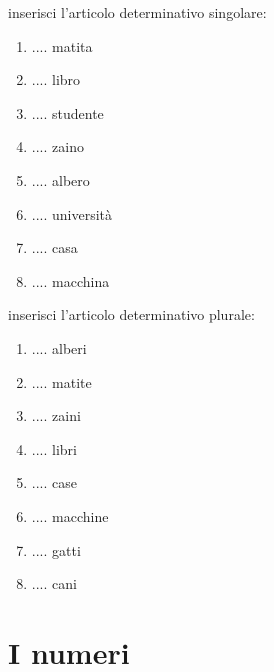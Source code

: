 \documentclass[letter,11pt]{article}
\newcommand{\myCode}[1]{\colorbox{gray!30}{#1}}
\begin{document}
\vskip 0.1in
\myCode{inserisci l'articolo determinativo singolare: }

\begin{multicols}{2}
\begin{enumerate}
    \item .... matita
    \item .... libro
    \item .... studente
    \item .... zaino
    \item .... albero
    \item .... università
    \item .... casa
    \item .... macchina
\end{enumerate}
\end{multicols}

\vskip 0.1in
\myCode{inserisci l'articolo determinativo plurale: }

\begin{multicols}{2}
\begin{enumerate}
    \item .... alberi
    \item .... matite
    \item .... zaini
    \item .... libri
    \item .... case
    \item .... macchine
    \item .... gatti
    \item .... cani
\end{enumerate}
\end{multicols}

\vskip 0.5in

\section*{I numeri}
\vskip 0.2in
\end{document}

